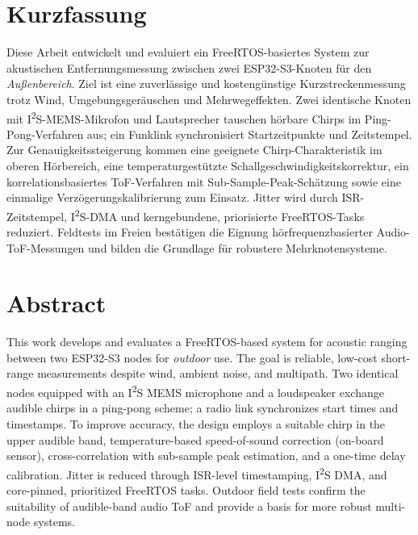 \section*{Kurzfassung}

Diese Arbeit entwickelt und evaluiert ein FreeRTOS-basiertes System zur akustischen 
Entfernungsmessung zwischen zwei ESP32-S3-Knoten für den \emph{Außenbereich}. Ziel ist 
eine zuverlässige und kostengünstige Kurzstreckenmessung trotz Wind, Umgebungsgeräuschen 
und Mehrwegeffekten. Zwei identische Knoten mit I\textsuperscript{2}S-MEMS-Mikrofon und 
 Lautsprecher tauschen hörbare Chirps im Ping-Pong-Verfahren aus; ein Funklink synchronisiert 
 Startzeitpunkte und Zeitstempel. Zur Genauigkeitssteigerung kommen eine geeignete 
 Chirp-Charakteristik im oberen Hörbereich, eine temperaturgestützte 
 Schallgeschwindigkeitskorrektur, ein korrelationsbasiertes ToF-Verfahren mit 
 Sub-Sample-Peak-Schätzung sowie eine einmalige Verzögerungskalibrierung zum Einsatz. 
 Jitter wird durch ISR-Zeitstempel, I\textsuperscript{2}S-DMA und kerngebundene,
  priorisierte FreeRTOS-Tasks reduziert. Feldtests im Freien bestätigen die Eignung 
  hörfrequenzbasierter Audio-ToF-Messungen und bilden die Grundlage für robustere 
  Mehrknotensysteme.

\section*{Abstract}

This work develops and evaluates a FreeRTOS-based system for acoustic ranging between 
two ESP32-S3 nodes for \emph{outdoor} use. The goal is reliable, low-cost short-range 
measurements despite wind, ambient noise, and multipath. Two identical nodes equipped 
with an I\textsuperscript{2}S MEMS microphone and a loudspeaker exchange audible chirps 
in a ping-pong scheme; a radio link synchronizes start times and timestamps. To improve accuracy,
 the design employs a suitable chirp in the upper audible band, temperature-based speed-of-sound 
 correction (on-board sensor), cross-correlation with sub-sample peak estimation, and a one-time 
 delay calibration. Jitter is reduced through ISR-level timestamping, I\textsuperscript{2}S DMA,
  and core-pinned, prioritized FreeRTOS tasks. Outdoor field tests confirm the suitability of 
  audible-band audio ToF and provide a basis for more robust multi-node systems.
